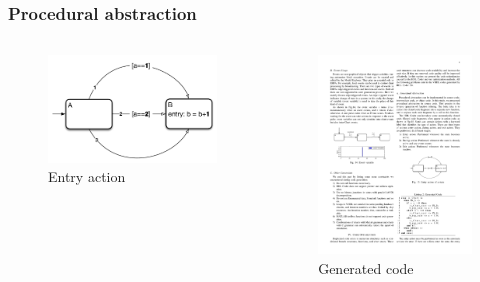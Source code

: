 \documentclass[12pt,beamer]{beamer}
\begin{document}
\begin{frame}
\frametitle{Procedural abstraction}
\begin{columns}
	\begin{column}{0.5\textwidth}
		\begin{figure}
			\includegraphics[width=\textwidth]{pic/EntryAction.pdf}
			\caption{Entry action}
		\end{figure}
	\end{column}
	
	\begin{column}{0.5\textwidth}
		\begin{figure}
			\includegraphics[width=\textwidth]{pic/GeneratedCode.pdf}
			\caption{Generated code}
		\end{figure}
	\end{column}
\end{columns}
\end{frame}
\end{document}
